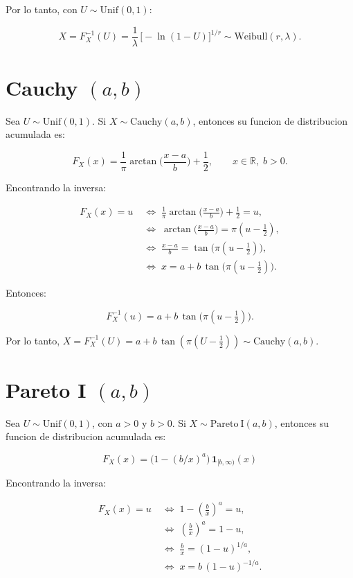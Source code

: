 \documentclass[11pt]{article}
\begin{document}
Por lo tanto, con \(U\sim\mathrm{Unif}(0,1)\):

\[
X=F_X^{-1}(U)=\frac{1}{\lambda}\,\bigl[-\ln(1-U)\bigr]^{1/r}\sim\mathrm{Weibull}(r,\lambda).
\]

    \hypertarget{cauchy-ab}{%
\section{\texorpdfstring{Cauchy
\((a,b)\)}{Cauchy (a,b)}}\label{cauchy-ab}}

    Sea \textbf{\(U\sim\mathrm{Unif}(0,1)\)}. Si
\(X\sim\mathrm{Cauchy}(a,b)\), entonces su funcion de distribucion
acumulada es:

\[
F_X(x)=\frac{1}{\pi}\arctan\!\Big(\frac{x-a}{b}\Big)+\frac{1}{2},\qquad x\in\mathbb{R},\; b>0.
\]

Encontrando la inversa:

\[
\begin{aligned}
F_X(x)=u 
&\;\iff\; \frac{1}{\pi}\arctan\!\Big(\frac{x-a}{b}\Big)+\frac{1}{2}=u,\\
&\;\iff\; \arctan\!\Big(\frac{x-a}{b}\Big)=\pi\!\left(u-\tfrac{1}{2}\right),\\
&\;\iff\; \frac{x-a}{b}=\tan\!\big(\pi(u-\tfrac{1}{2})\big),\\
&\;\iff\; x=a+b\,\tan\!\big(\pi(u-\tfrac{1}{2})\big).
\end{aligned}
\]

Entonces:

\[
F_X^{-1}(u)=a+b\,\tan\!\big(\pi(u-\tfrac{1}{2})\big).
\]

Por lo tanto,
\(X=F_X^{-1}(U)=a+b\,\tan(\pi(U-\tfrac{1}{2}))\sim\mathrm{Cauchy}(a,b)\).

    \hypertarget{pareto-i-ab}{%
\section{\texorpdfstring{Pareto I
\((a,b)\)}{Pareto I (a,b)}}\label{pareto-i-ab}}

    Sea \textbf{\(U\sim\mathrm{Unif}(0,1)\)}, con \(a>0\) y \(b>0\). Si
\(X\sim\mathrm{Pareto\ I}(a,b)\), entonces su funcion de distribucion
acumulada es:

\[
F_X(x)=\bigl(1-(b/x)^a\bigr)\,\mathbf{1}_{[b,\infty)}(x)
\]

Encontrando la inversa:

\[
\begin{aligned}
F_X(x)=u &\;\iff\; 1-\left(\frac{b}{x}\right)^a=u,\\
         &\;\iff\; \left(\frac{b}{x}\right)^a=1-u,\\
         &\;\iff\; \frac{b}{x}=(1-u)^{1/a},\\
         &\;\iff\; x=b\,(1-u)^{-1/a}.
\end{aligned}
\]
\end{document}
